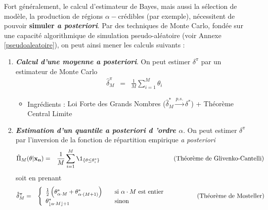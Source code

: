 Fort généralement, le calcul d'estimateur de Bayes, mais aussi la sélection de modèle, la production de régions $\alpha-$crédibles (par exemple), nécessitent de pouvoir {\bf simuler {\it a posteriori}}. Par des techniques de Monte Carlo, %
fondée sur une capacité algorithmique de simulation pseudo-aléatoire (voir Annexe \ref{pseudoaleatoire}), on peut ainsi mener les calculs suivants :

\begin{enumerate}
    \item \emph{\bf Calcul d'une moyenne {\it a posteriori}}. On peut estimer $\delta^{\pi}$ par un { estimateur de Monte Carlo}
\begin{eqnarray*}
\hat{\delta}^{\pi}_M & = & \frac{1}{M} \sum\limits_{i=1}^M \theta_i 
\end{eqnarray*}
\begin{itemize}
\item Ingrédients : { Loi Forte des Grands Nombres ($\hat{\delta}^*_M \xrightarrow{p.s.}{} \delta^*$) + Théorème Central Limite}
\end{itemize}

\item \emph{\bf Estimation d'un quantile {\it a posteriori} d 'ordre $\alpha$}. On peut estimer $\delta^{\pi}$ par 
{ l'inversion de la fonction de répartition empirique} {\it a posteriori}
\begin{eqnarray*}
\hat{\Pi}_M(\theta|{\bf x_n}) & = & \frac{1}{M} \sum\limits_{i=1}^M \1_{\{\theta\leq {\theta^*_i}\}} \hspace{4cm} \text{ (Théorème de Glivenko-Cantelli)}
\end{eqnarray*}
soit en prenant 
\begin{eqnarray*}
\hat{\delta}^{\pi}_M & = & \left\{ 
\begin{array}{lll} 
\frac{1}{2}\left(\theta^*_{\alpha\cdot M} + \theta^*_{\alpha\cdot (M+1)}\right) & & \text{si $\alpha\cdot M$ est entier} \\ 
\theta^*_{\lfloor\alpha\cdot{M}\rfloor +1} && \text{sinon}
\end{array} \right. \hspace{1.5cm} \text{ (Théorème de Mosteller)}
\end{eqnarray*}
\end{enumerate}


